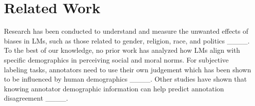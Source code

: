 \section{Related Work}
Research has been conducted to understand and measure the unwanted effects of biases in LMs, such as those related to gender, religion, race, and politics ____.  To the best of our knowledge, no prior work has analyzed how LMs align with specific demographics in perceiving social and moral norms. For subjective labeling tasks, annotators need to use their own judgement which has been shown to be influenced by human demographics ____. Other studies have shown that knowing annotator demographic information can help predict annotation disagreement ____. %